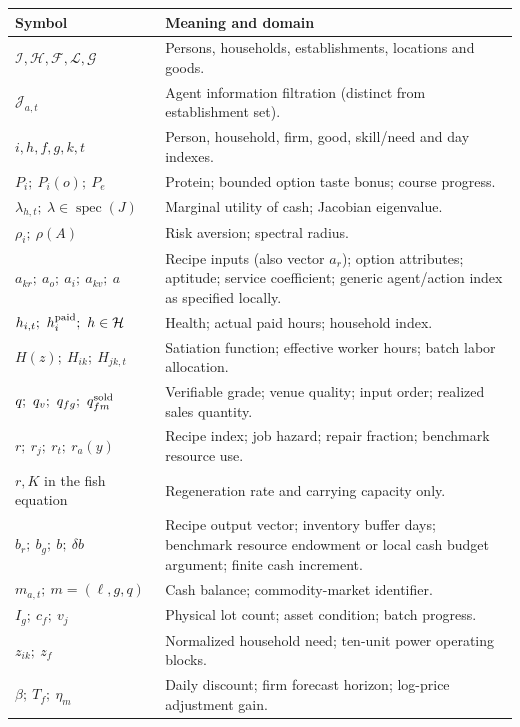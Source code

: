 \documentclass[10pt,a4paper,twocolumn]{article}
\newcommand{\HH}{\mathcal H}
\begin{document}
\begin{longtable}{@{}p{}p{}@{}}
\toprule Symbol & Meaning and domain\\\midrule
$\mathcal I,\HH,\mathcal F,\mathcal L,\mathcal G$ & Persons, households, establishments, locations and goods.\\
$\mathcal J_{a,t}$ & Agent information filtration (distinct from establishment set).\\
$i,h,f,g,k,t$ & Person, household, firm, good, skill/need and day indexes.\\
$P_i;\ P_i(o);\ P_e$ & Protein; bounded option taste bonus; course progress.\\
$\lambda_{h,t};\ \lambda\in\operatorname{spec}(J)$ & Marginal utility of cash; Jacobian eigenvalue.\\
$\rho_i;\ \rho(A)$ & Risk aversion; spectral radius.\\
$a_{kr};\ a_o;\ a_i;\ a_{kv};\ a$ & Recipe inputs (also vector $a_r$); option attributes; aptitude; service coefficient; generic agent/action index as specified locally.\\
$h_{i,t};\ h_i^{\rm paid};\ h\in\HH$ & Health; actual paid hours; household index.\\
$H(z);\ H_{ik};\ H_{jk,t}$ & Satiation function; effective worker hours; batch labor allocation.\\
$q;\ q_v;\ q_{fg};\ q^{\rm sold}_{fm}$ & Verifiable grade; venue quality; input order; realized sales quantity.\\
$r;\ r_j;\ r_t;\ r_a(y)$ & Recipe index; job hazard; repair fraction; benchmark resource use.\\
$r,K$ in the fish equation & Regeneration rate and carrying capacity only.\\
$b_r;\ b_g;\ b;\ \delta b$ & Recipe output vector; inventory buffer days; benchmark resource endowment or local cash budget argument; finite cash increment.\\
$m_{a,t};\ m=(\ell,g,q)$ & Cash balance; commodity-market identifier.\\
$I_g;\ c_f;\ v_j$ & Physical lot count; asset condition; batch progress.\\
$z_{ik};\ z_f$ & Normalized household need; ten-unit power operating blocks.\\
$\beta;\ T_f;\ \eta_m$ & Daily discount; firm forecast horizon; log-price adjustment gain.\\
\bottomrule
\end{longtable}
\end{document}
